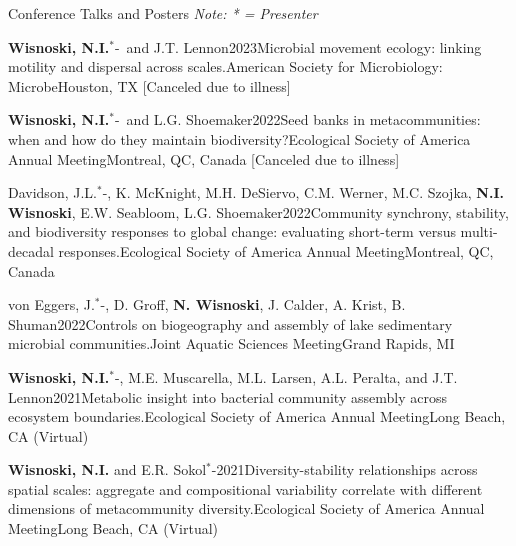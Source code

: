 \documentclass{resume} %
\newcommand{\Star}{\ensuremath{^*}\kern-\scriptspace}
\begin{document}
\bigskip

\begin{rhangSection}{Conference Talks and Posters}
\emph{\small Note: * = Presenter}

\begin{Presentation}{{\bf Wisnoski, N.I.}\Star\ and J.T. Lennon}{2023}{Microbial movement ecology: linking motility and dispersal across scales.}{American Society for Microbiology: Microbe}{Houston, TX [Canceled due to illness]}
\end{Presentation}

\begin{Presentation}{{\bf Wisnoski, N.I.}\Star\ and L.G. Shoemaker}{2022}{Seed banks in metacommunities: when and how do they maintain biodiversity?}{Ecological Society of America Annual Meeting}{Montreal, QC, Canada [Canceled due to illness]}
\end{Presentation}
    
\begin{Presentation}{Davidson, J.L.\Star, K. McKnight, M.H. DeSiervo, C.M. Werner, M.C. Szojka, {\bf N.I. Wisnoski}, E.W. Seabloom, L.G. Shoemaker}{2022}{Community synchrony, stability, and biodiversity responses to global change: evaluating short-term versus multi-decadal responses.}{Ecological Society of America Annual Meeting}{Montreal, QC, Canada}
\end{Presentation}

\begin{Presentation}{von Eggers, J.\Star, D. Groff, {\bf N. Wisnoski}, J. Calder, A. Krist, B. Shuman}{2022}{Controls on biogeography and assembly of lake sedimentary microbial communities.}{Joint Aquatic Sciences Meeting}{Grand Rapids, MI}
\end{Presentation}

\begin{Presentation}{{\bf Wisnoski, N.I.}\Star, M.E. Muscarella, M.L. Larsen, A.L. Peralta, and J.T. Lennon}{2021}{Metabolic insight into bacterial community assembly across ecosystem boundaries.}{Ecological Society of America Annual Meeting}{Long Beach, CA (Virtual)}
    \end{Presentation}
    
\begin{Presentation}{{\bf Wisnoski, N.I.} and E.R. Sokol\Star}{2021}{Diversity-stability relationships across spatial scales: aggregate and compositional variability correlate with different dimensions of metacommunity diversity.}{Ecological Society of America Annual Meeting}{Long Beach, CA (Virtual)}
\end{Presentation}


\end{rhangSection}
\end{document}
